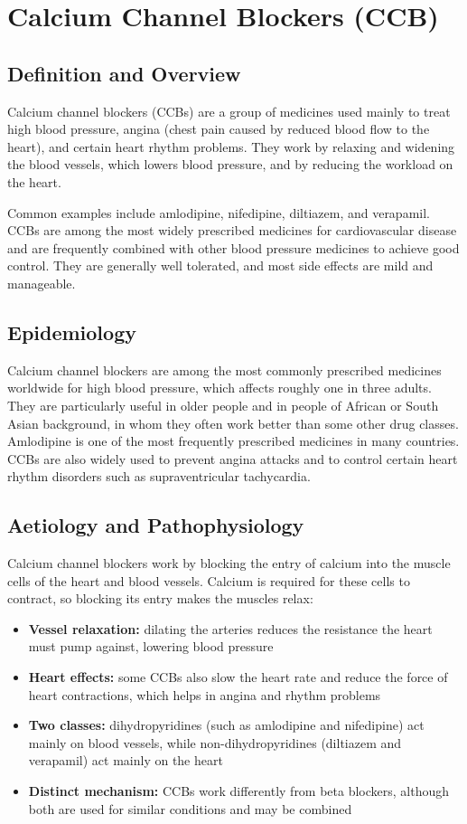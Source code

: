 \chapter{Calcium Channel Blockers (CCB)}

\section*{Definition and Overview}
Calcium channel blockers (CCBs) are a group of medicines used mainly to treat high blood pressure, angina (chest pain caused by reduced blood flow to the heart), and certain heart rhythm problems. They work by relaxing and widening the blood vessels, which lowers blood pressure, and by reducing the workload on the heart.

Common examples include amlodipine, nifedipine, diltiazem, and verapamil. CCBs are among the most widely prescribed medicines for cardiovascular disease and are frequently combined with other blood pressure medicines to achieve good control. They are generally well tolerated, and most side effects are mild and manageable.

\section*{Epidemiology}
Calcium channel blockers are among the most commonly prescribed medicines worldwide for high blood pressure, which affects roughly one in three adults. They are particularly useful in older people and in people of African or South Asian background, in whom they often work better than some other drug classes. Amlodipine is one of the most frequently prescribed medicines in many countries. CCBs are also widely used to prevent angina attacks and to control certain heart rhythm disorders such as supraventricular tachycardia.

\section*{Aetiology and Pathophysiology}
Calcium channel blockers work by blocking the entry of calcium into the muscle cells of the heart and blood vessels. Calcium is required for these cells to contract, so blocking its entry makes the muscles relax:
\begin{itemize}
    \item \textbf{Vessel relaxation:} dilating the arteries reduces the resistance the heart must pump against, lowering blood pressure
    \item \textbf{Heart effects:} some CCBs also slow the heart rate and reduce the force of heart contractions, which helps in angina and rhythm problems
    \item \textbf{Two classes:} dihydropyridines (such as amlodipine and nifedipine) act mainly on blood vessels, while non-dihydropyridines (diltiazem and verapamil) act mainly on the heart
    \item \textbf{Distinct mechanism:} CCBs work differently from beta blockers, although both are used for similar conditions and may be combined
\end{itemize}

